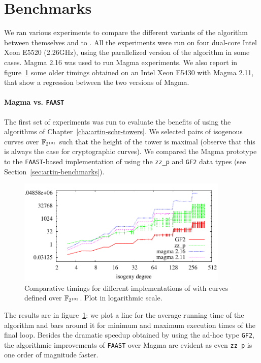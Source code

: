 

\section{Benchmarks}
\label{sec:benchmarks}
We ran various experiments to compare the different variants of the
algorithm \ctwo{} between themselves and to . All
the experiments were run on four dual-core Intel Xeon E5520 (2.26GHz),
using the parallelized version of the algorithm in some cases. Magma
2.16 was used to run Magma experiments. We also report in
figure~\ref{fig:2-101} some older timings obtained on an Intel Xeon
E5430 with Magma 2.11, that show a regression between the two versions
of Magma.

\paragraph{Magma vs. \texttt{FAAST}}
\label{sec:magma-vs.-textttf}
The first set of experiments was run to evaluate the benefits of using
the algorithms of Chapter~\ref{cha:artin-schr-towers}. We selected
pairs of isogenous curves over $\mathbb{F}_{2^{101}}$ such that the height of
the tower is maximal (observe that this is always the case for
cryptographic curves).  We compared the Magma prototype to the
\texttt{FAAST}-based implementation of \ctwoasfimc{} using the
\texttt{zz\_p} and \texttt{GF2} data types (see
Section~\ref{sec:artin-benchmarks}).

\begin{figure}
  \centering
  \includegraphics[width=0.9\textwidth]{isogeny/p2}
  \caption{Comparative timings for different implementations of \ctwoasfimc{} with curves defined over $\mathbb{F}_{2^{101}}$. Plot in logarithmic scale.}
  \label{fig:2-101}
\end{figure}

The results are in figure~\ref{fig:2-101}: we plot a line for the
average running time of the algorithm and bars around it for minimum
and maximum execution times of the final loop. Besides the dramatic
speedup obtained by using the ad-hoc type \texttt{GF2}, the
algorithmic improvements of \texttt{FAAST} over Magma are evident as
even \texttt{zz\_p} is one order of magnitude faster.

